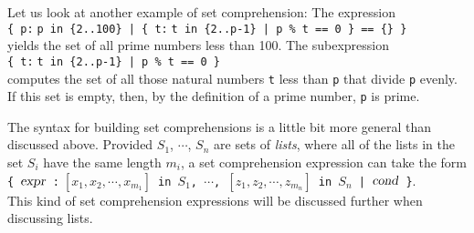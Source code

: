 Let us look at another example of set comprehension:  The expression
\\[0.2cm]
\hspace*{1.3cm}
\texttt{\{ p:$\;$p in \{2..100\} | \{ t:$\;$t in \{2..p-1\} | p \% t == 0 \} == \{\} \}}
\\[0.2cm]
yields the set of all prime numbers less than 100.  The subexpression
\\[0.2cm]
\hspace*{1.3cm}
\texttt{\{ t:$\;$t in \{2..p-1\} | p \% t == 0 \}}
\\[0.2cm]
computes the set of all those natural numbers \texttt{t} less than \texttt{p} that divide
\texttt{p} evenly.  If this set is empty, then, by the definition of a prime number, \texttt{p} is prime.

The syntax for building set comprehensions is a little bit more
general than discussed above.  Provided $S_1$, $\cdots$, $S_n$ are sets of \emph{lists},
where all of the lists in the set $S_i$ have the same length $m_i$, a set comprehension expression
can take the form
\\[0.2cm]
\hspace*{1.3cm}
\texttt{\{ $\textsl{expr}$ :$\;[x_1,x_2,\cdots,x_{m_1}]$ in $S_1$, $\cdots$, $[z_1,z_2,\cdots, z_{m_n}]$ in $S_n$ | $\textsl{cond}$ \}}.
\\[0.2cm]
This kind of set comprehension expressions will be discussed further when discussing lists.

